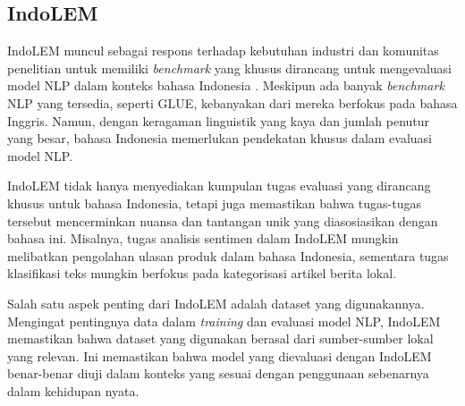 \subsection{IndoLEM}

IndoLEM muncul sebagai respons terhadap kebutuhan industri dan komunitas penelitian untuk memiliki \textit{benchmark} yang khusus dirancang untuk mengevaluasi model NLP dalam konteks bahasa Indonesia \parencite{indobert}. Meskipun ada banyak \textit{benchmark} NLP yang tersedia, seperti GLUE, kebanyakan dari mereka berfokus pada bahasa Inggris. Namun, dengan keragaman linguistik yang kaya dan jumlah penutur yang besar, bahasa Indonesia memerlukan pendekatan khusus dalam evaluasi model NLP.

IndoLEM tidak hanya menyediakan kumpulan tugas evaluasi yang dirancang khusus untuk bahasa Indonesia, tetapi juga memastikan bahwa tugas-tugas tersebut mencerminkan nuansa dan tantangan unik yang diasosiasikan dengan bahasa ini. Misalnya, tugas analisis sentimen dalam IndoLEM mungkin melibatkan pengolahan ulasan produk dalam bahasa Indonesia, sementara tugas klasifikasi teks mungkin berfokus pada kategorisasi artikel berita lokal.

Salah satu aspek penting dari IndoLEM adalah dataset yang digunakannya. Mengingat pentingnya data dalam \textit{training} dan evaluasi model NLP, IndoLEM memastikan bahwa dataset yang digunakan berasal dari sumber-sumber lokal yang relevan. Ini memastikan bahwa model yang dievaluasi dengan IndoLEM benar-benar diuji dalam konteks yang sesuai dengan penggunaan sebenarnya dalam kehidupan nyata.